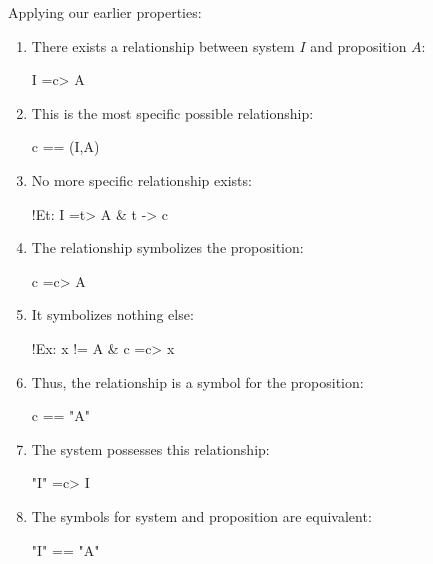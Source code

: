 \documentclass[runningheads]{llncs}
\begin{document}
Applying our earlier properties:

\begin{enumerate}
    \item There exists a relationship between system $I$ and proposition $A$: 
    
    \begin{center}
    I =c> A
    \end{center}
    
    \item This is the most specific possible relationship: 
    
    \begin{center}
    c == (I,A)
    \end{center}
    
    \item No more specific relationship exists: 
    
    \begin{center}
    !Et: I =t> A \& t -> c
    \end{center}
    
    \item The relationship symbolizes the proposition: 
    
    \begin{center}
    c =c> A
    \end{center}
    
    \item It symbolizes nothing else: 
    
    \begin{center}
    !Ex: x != A \& c =c> x
    \end{center}
    
    \item Thus, the relationship is a symbol for the proposition:
    
    \begin{center}
    c == "A"
    \end{center}
    
    \item The system possesses this relationship: 
    
    \begin{center}
    "I" =c> I
    \end{center}
    
    \item The symbols for system and proposition are equivalent: 
    
    \begin{center}
    "I" == "A"
    \end{center}
    

\end{enumerate}
\end{document}
